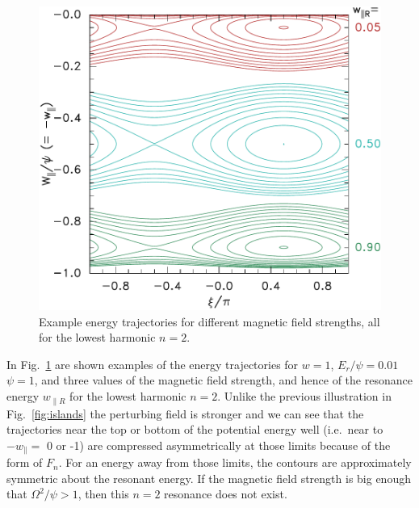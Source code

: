 \documentclass[draft,jgrga]{agutex}
\def\wp{w_\parallel}
\def\wr{w_{\parallel R}}
\begin{document}
\begin{article}
\begin{figure}%
  \centering
  \includegraphics[width=0.6\hsize]{cont559}
  \caption{Example energy trajectories for different magnetic field strengths,
  all for the lowest harmonic $n=2$.}
  \label{fig:entraj}
\end{figure}
In Fig.\ \ref{fig:entraj} are shown examples of the energy
trajectories for $w=1$, $E_r/\psi=0.01$ $\psi=1$, and three values of the
magnetic field strength, and hence of the resonance energy $\wr $ for
the lowest harmonic $n=2$.  Unlike the previous illustration in Fig.\
\ref{fig:islands} the perturbing field is stronger and we can see
that the trajectories near the top or bottom of the potential energy
well (i.e.\ near to $-\wp =$ 0 or -1) are compressed asymmetrically at
those limits because of the form of $F_n$. For an energy away from
those limits, the contours are approximately symmetric about the
resonant energy. If the magnetic field strength is big enough that
$\Omega^2/\psi >1$, then this $n=2$ resonance does not exist.


\end{article}
\end{document}
